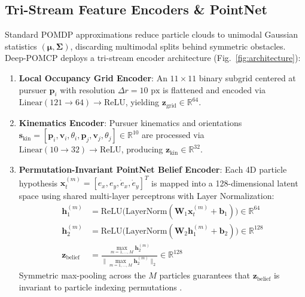 \documentclass[conference]{IEEEtran}
\begin{document}
\subsection{Tri-Stream Feature Encoders \& PointNet}
Standard POMDP approximations reduce particle clouds to unimodal Gaussian statistics $(\boldsymbol{\mu}, \boldsymbol{\Sigma})$, discarding multimodal splits behind symmetric obstacles. Deep-POMCP deploys a tri-stream encoder architecture (Fig.~\ref{fig:architecture}):
\begin{enumerate}
    \item \textbf{Local Occupancy Grid Encoder}: An $11 \times 11$ binary subgrid centered at pursuer $\mathbf{p}_i$ with resolution $\Delta r = 10\text{ px}$ is flattened and encoded via $\text{Linear}(121 \to 64) \to \text{ReLU}$, yielding $\mathbf{z}_{\text{grid}} \in \mathbb{R}^{64}$.
    \item \textbf{Kinematics Encoder}: Pursuer kinematics and orientations $\mathbf{s}_{\text{kin}} = [\mathbf{p}_i, \mathbf{v}_i, \theta_i, \mathbf{p}_j, \mathbf{v}_j, \theta_j] \in \mathbb{R}^{10}$ are processed via $\text{Linear}(10 \to 32) \to \text{ReLU}$, producing $\mathbf{z}_{\text{kin}} \in \mathbb{R}^{32}$.
    \item \textbf{Permutation-Invariant PointNet Belief Encoder}: Each 4D particle hypothesis $\mathbf{x}_t^{(m)} = [e_x, e_y, \dot{e}_x, \dot{e}_y]^T$ is mapped into a 128-dimensional latent space using shared multi-layer perceptrons with Layer Normalization:
    \begin{align}
        \mathbf{h}_1^{(m)} &= \text{ReLU}\big(\text{LayerNorm}(\mathbf{W}_1 \mathbf{x}_t^{(m)} + \mathbf{b}_1)\big) \in \mathbb{R}^{64} \\
        \mathbf{h}_2^{(m)} &= \text{ReLU}\big(\text{LayerNorm}(\mathbf{W}_2 \mathbf{h}_1^{(m)} + \mathbf{b}_2)\big) \in \mathbb{R}^{128} \\
        \mathbf{z}_{\text{belief}} &= \frac{\max_{m=1, \dots, M} \mathbf{h}_2^{(m)}}{\big\|\max_{m=1, \dots, M} \mathbf{h}_2^{(m)}\big\|_2} \in \mathbb{R}^{128}
    \end{align}
    Symmetric max-pooling across the $M$ particles guarantees that $\mathbf{z}_{\text{belief}}$ is invariant to particle indexing permutations \cite{qi2017pointnet}.
\end{enumerate}
\end{document}
